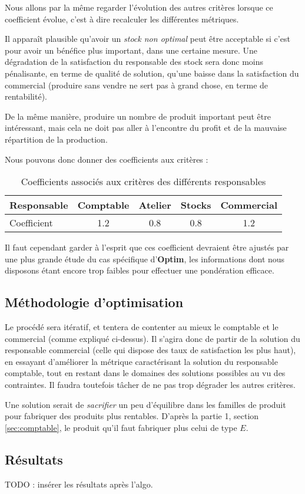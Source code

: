 Nous allons par la même regarder l'évolution des autres critères lorsque ce
coefficient évolue, c'est à dire recalculer les différentes métriques.

Il apparaît plausible qu'avoir un \emph{stock non optimal} peut être acceptable
si c'est pour avoir un bénéfice plus important, dans une certaine mesure. Une
dégradation de la satisfaction du responsable des stock sera donc moins
pénalisante, en terme de qualité de solution, qu'une baisse dans la satisfaction
du commercial (produire sans vendre ne sert pas à grand chose, en terme de
rentabilité).

De la même manière, produire un nombre de produit important peut être
intéressant, mais cela ne doit pas aller à l'encontre du profit et de la
mauvaise répartition de la production.

Nous pouvons donc donner des coefficients aux critères :

\begin{table}[h!]
\begin{center}
\begin{tabular}{|l||c|c|c|c|}
\hline
    Responsable & Comptable & Atelier &  Stocks & Commercial  \\
	\hline
    Coefficient & 1.2	    & 0.8     & 0.8	& 1.2 \\
	\hline
	\end{tabular}
	\end{center}
\caption{Coefficients associés aux critères des différents responsables}
\end{table}

Il faut cependant garder à l'esprit que ces coefficient devraient être ajustés
par une plus grande étude du cas spécifique d'\textbf{Optim}, les informations
dont nous disposons étant encore trop faibles pour effectuer une pondération
efficace.

\subsection{Méthodologie d'optimisation}
Le procédé sera itératif, et tentera de contenter au mieux le comptable et le
commercial (comme expliqué ci-dessus). Il s'agira donc de partir de la solution
du responsable commercial (celle qui dispose des taux de satisfaction les plus
haut), en essayant d'améliorer la métrique caractérisant la solution du
responsable comptable, tout en restant dans le domaines des solutions possibles
au vu des contraintes. Il faudra toutefois tâcher de ne pas trop dégrader les
autres critères.

Une solution serait de \emph{sacrifier} un peu d'équilibre dans les familles de
produit pour fabriquer des produits plus rentables. D'après la partie 1, section 
\ref{sec:comptable}, le produit qu'il faut fabriquer plus celui de type $E$.

\subsection{Résultats}
TODO : insérer les résultats après l'algo.

